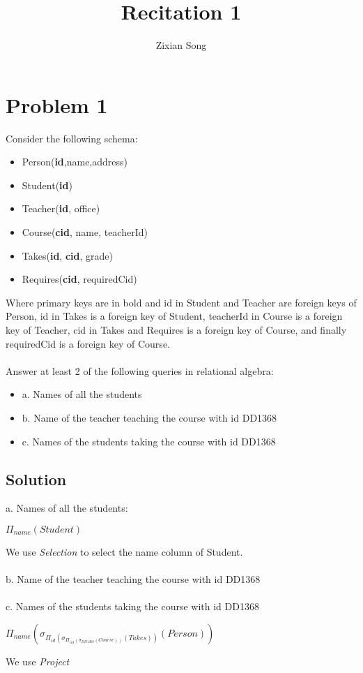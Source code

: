 \documentclass[a4paper]{article}
\title{Recitation 1}
\author{Zixian Song}
\begin{document}
\maketitle


\section{Problem 1}
Consider the following schema:
\begin{itemize}
    \item Person(\textbf{id},name,address)
    \item Student(\textbf{id})
    \item Teacher(\textbf{id}, office)
    \item Course(\textbf{cid}, name, teacherId)
    \item Takes(\textbf{id}, \textbf{cid}, grade)
    \item Requires(\textbf{cid}, requiredCid)
\end{itemize}
Where primary keys are in bold and id in Student and Teacher are foreign keys of Person, id in Takes is a foreign key of Student, teacherId in Course is a foreign key of Teacher, cid in Takes and Requires is a foreign key of Course, and finally requiredCid is a foreign key of Course.
\\ \\
Answer at least 2 of the following queries in relational algebra:
\begin{itemize}
    \item a. Names of all the students
    \item b. Name of the teacher teaching the course with id DD1368
    \item c. Names of the students taking the course with id DD1368
\end{itemize}
\newpage 
\subsection{Solution}
a. Names of all the students:
    \begin{center}
        $\Pi_{name}(Student)$
    \end{center}
We use \textit{Selection} to select the name column of Student.
\\ \\
b. Name of the teacher teaching the course with id DD1368
\\ \\
c. Names of the students taking the course with id DD1368
    \begin{center}
    $\Pi_{name}(\sigma_{\Pi_{id}(\sigma_{\Pi_{cid}(\sigma_{DD1368}(Course))}(Takes))}(Person))$
    \end{center}
We use \textit{Project}
\end{document}
